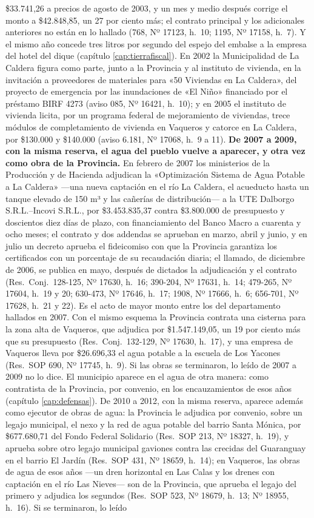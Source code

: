 \$33.741,26 a precios de agosto de 2003, y un mes y medio después corrige el monto a \$42.848,85, un 27 por ciento más; el contrato principal y los adicionales anteriores no están en lo hallado (768, Nº 17123, h.\ 10; 1195, Nº 17158, h.\ 7). Y el mismo año concede tres litros por segundo del espejo del embalse a la empresa del hotel del dique (capítulo \ref{cap:tierrafiscal}). En 2002 la Municipalidad de La Caldera figura como parte, junto a la Provincia y al instituto de vivienda, en la invitación a proveedores de materiales para «50 Viviendas en La Caldera», del proyecto de emergencia por las inundaciones de «El Niño» financiado por el préstamo BIRF 4273 (aviso 085, Nº 16421, h.\ 10); y en 2005 el instituto de vivienda licita, por un programa federal de mejoramiento de viviendas, trece módulos de completamiento de vivienda en Vaqueros y catorce en La Caldera, por \$130.000 y \$140.000 (aviso 6.181, Nº 17068, h.\ 9 a 11). \textbf{De 2007 a 2009, con la misma reserva, el agua del pueblo vuelve a aparecer, y otra vez como obra de la Provincia.} En febrero de 2007 los ministerios de la Producción y de Hacienda adjudican la «Optimización Sistema de Agua Potable a La Caldera» ---una nueva captación en el río La Caldera, el acueducto hasta un tanque elevado de 150 m³ y las cañerías de distribución--- a la UTE Dalborgo S.R.L.--Incovi S.R.L., por \$3.453.835,37 contra \$3.800.000 de presupuesto y doscientos diez días de plazo, con financiamiento del Banco Macro a cuarenta y ocho meses; el contrato y dos addendas se aprueban en marzo, abril y junio, y en julio un decreto aprueba el fideicomiso con que la Provincia garantiza los certificados con un porcentaje de su recaudación diaria; el llamado, de diciembre de 2006, se publica en mayo, después de dictados la adjudicación y el contrato (Res.\ Conj.\ 128-125, Nº 17630, h.\ 16; 390-204, Nº 17631, h.\ 14; 479-265, Nº 17604, h.\ 19 y 20; 630-473, Nº 17646, h.\ 17; 1908, Nº 17666, h.\ 6; 656-701, Nº 17628, h.\ 21 y 22). Es el acto de mayor monto entre los del departamento hallados en 2007. Con el mismo esquema la Provincia contrata una cisterna para la zona alta de Vaqueros, que adjudica por \$1.547.149,05, un 19 por ciento más que su presupuesto (Res.\ Conj.\ 132-129, Nº 17630, h.\ 17), y una empresa de Vaqueros lleva por \$26.696,33 el agua potable a la escuela de Los Yacones (Res.\ SOP 690, Nº 17745, h.\ 9). Si las obras se terminaron, lo leído de 2007 a 2009 no lo dice. El municipio aparece en el agua de otra manera: como contratista de la Provincia, por convenio, en los encauzamientos de esos años (capítulo \ref{cap:defensas}). De 2010 a 2012, con la misma reserva, aparece además como ejecutor de obras de agua: la Provincia le adjudica por convenio, sobre un legajo municipal, el nexo y la red de agua potable del barrio Santa Mónica, por \$677.680,71 del Fondo Federal Solidario (Res.\ SOP 213, Nº 18327, h.\ 19), y aprueba sobre otro legajo municipal gaviones contra las crecidas del Guaranguay en el barrio El Jardín (Res.\ SOP 431, Nº 18659, h.\ 14); en Vaqueros, las obras de agua de esos años ---un dren horizontal en Las Calas y los drenes con captación en el río Las Nieves--- son de la Provincia, que aprueba el legajo del primero y adjudica los segundos (Res.\ SOP 523, Nº 18679, h.\ 13; Nº 18955, h.\ 16). Si se terminaron, lo leído 